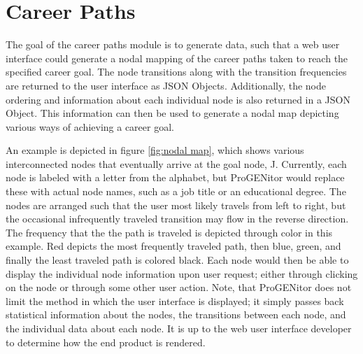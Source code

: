 \section{Career Paths}
\label{sect:career-paths}
The goal of the career paths module is to generate data, such that a web user
interface could generate a nodal mapping of the career paths taken to reach the
specified career goal.  The node transitions along with the transition
frequencies are returned to the user interface as JSON Objects.  Additionally,
the node ordering and information about each individual node is also returned in
a JSON Object.  This information can then be used to generate a nodal map
depicting various ways of achieving a career goal.  

An example is depicted in figure \ref{fig:nodal map}, which shows various
interconnected nodes that eventually arrive at the goal node, J.  Currently,
each node is labeled with a letter from the alphabet, but ProGENitor would
replace these with actual node names, such as a job title or an educational
degree. The nodes are arranged such that the user most likely travels from left
to right, but the occasional infrequently traveled transition may flow in the
reverse direction.  The frequency that the the path is traveled is depicted
through color in this example.  Red depicts the most frequently traveled path,
then blue, green, and finally the least traveled path is colored black.  Each
node would then be able to display the individual node information upon user
request; either through clicking on the node or through some other user action. 
Note, that ProGENitor does not limit the method in which the user interface is
displayed; it simply passes back statistical information about the nodes, the
transitions between each node, and the individual data about each node.  It is
up to the web user interface developer to determine how the end product is rendered.


\usetikzlibrary{shapes,arrows,chains}

